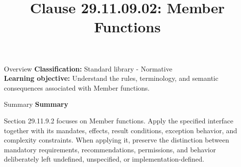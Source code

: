 \documentclass[10pt,letterpaper]{article}
\title{Clause 29.11.09.02: Member Functions}
\author{}
\date{}
\begin{document}
\maketitle
\begin{CornellOverviewBox}{Overview}
\textbf{Classification:} Standard library - Normative\\[2pt]
\textbf{Learning objective:} Understand the rules, terminology, and semantic consequences associated with Member functions.
\end{CornellOverviewBox}\begin{CornellSummaryBox}{Summary}
{\sffamily\bfseries\color{Accent} Summary}\par\vspace{3pt}Section 29.11.9.2 focuses on Member functions. Apply the specified interface together with its mandates, effects, result conditions, exception behavior, and complexity constraints. When applying it, preserve the distinction between mandatory requirements, recommendations, permissions, and behavior deliberately left undefined, unspecified, or implementation-defined.
\end{CornellSummaryBox}
\end{document}
